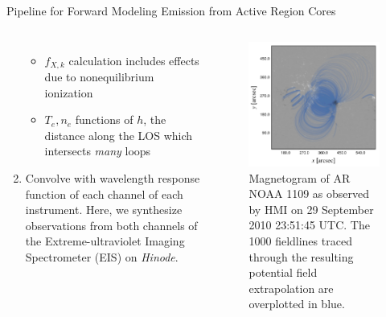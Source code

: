 \documentclass[final]{beamer}
\begin{document}
\begin{frame}
\begin{columns}[T]
\begin{column}{0.49\linewidth}
\begin{block}{Pipeline for Forward Modeling Emission from Active Region Cores}
\begin{columns}[T]
\begin{column}{0.59\columnwidth}
\begin{enumerate}
\begin{equation*}
          \end{equation*}
          \begin{itemize}
            \item $f_{X,k}$ calculation includes effects due to nonequilibrium ionization \citep[e.g.][]{bradshaw_numerical_2009,bradshaw_what_2011}
            \item $T_e,n_e$ functions of $h$, the distance along the LOS which intersects \textit{many} loops
          \end{itemize}
        \item Convolve with wavelength response function of each channel of each instrument. Here, we synthesize observations from both channels of the Extreme-ultraviolet Imaging Spectrometer (EIS) on \textit{Hinode}.
        \end{enumerate}
      \end{column}
      \begin{column}{0.39\columnwidth}
        \vspace{7ex}
        \begin{figure}
          \includegraphics[width=\columnwidth]{figures/hmi_map_with_lines.pdf}
          \caption{Magnetogram of AR NOAA 1109 as observed by HMI on 29 September 2010 23:51:45 UTC. The 1000 fieldlines traced through the resulting potential field extrapolation are overplotted in blue.}
        \label{fig:hmi_map_with_lines}

\end{figure}
\end{column}
\end{columns}
\end{block}
\end{column}
\end{columns}
\end{frame}
\end{document}
